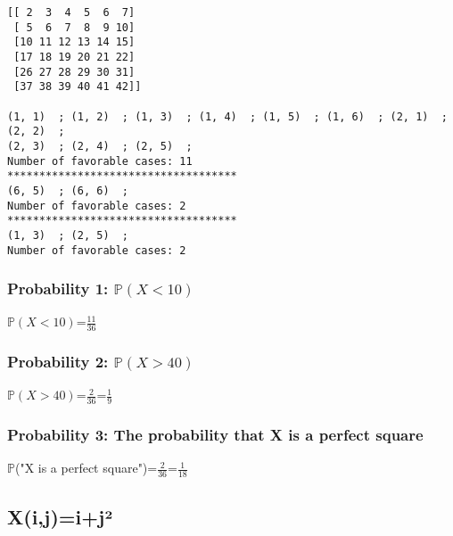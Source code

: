 \documentclass[11pt]{article}
\begin{document}
    \begin{Verbatim}[commandchars=\\\{\}]
[[ 2  3  4  5  6  7]
 [ 5  6  7  8  9 10]
 [10 11 12 13 14 15]
 [17 18 19 20 21 22]
 [26 27 28 29 30 31]
 [37 38 39 40 41 42]]

(1, 1)  ; (1, 2)  ; (1, 3)  ; (1, 4)  ; (1, 5)  ; (1, 6)  ; (2, 1)  ; (2, 2)  ;
(2, 3)  ; (2, 4)  ; (2, 5)  ;
Number of favorable cases: 11
************************************
(6, 5)  ; (6, 6)  ;
Number of favorable cases: 2
************************************
(1, 3)  ; (2, 5)  ;
Number of favorable cases: 2
    \end{Verbatim}
    
    \subsubsection{Probability 1: $\mathbb {P}$\((X < 10)\)}


$\mathbb {P}$\((X < 10)\)=$\frac{11}{36}$


\subsubsection{Probability 2: $\mathbb {P}$\((X > 40)\)}


$\mathbb {P}$\((X > 40)\)=$\frac{2}{36}$=$\frac{1}{9}$

\subsubsection{Probability 3: The probability that X is a perfect square}


$\mathbb {P}$("X is a perfect square")=$\frac{2}{36}$=$\frac{1}{18}$

    \hypertarget{xijijuxb2}{%
\subsection{X(i,j)=i+j²}\label{xijijuxb2}}
\end{document}
